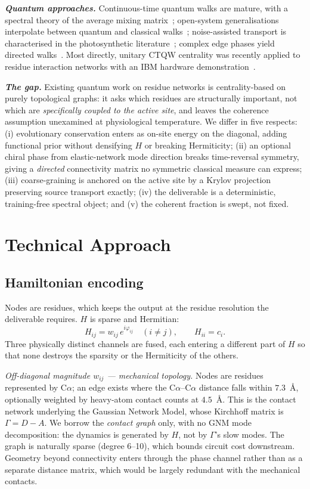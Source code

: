 \documentclass[10pt,a4paper]{article}
\newcommand{\lead}[1]{\textbf{\textit{#1}}}
\begin{document}
\lead{Quantum approaches.} Continuous-time quantum walks are mature, with a spectral theory of the
average mixing matrix~\cite{godsil2013}; open-system generalisations interpolate between quantum and
classical walks~\cite{whitfield2010}; noise-assisted transport is characterised in the photosynthetic
literature~\cite{mohseni2008,rebentrost2009}; complex edge phases yield directed
walks~\cite{lu2016}. Most directly, unitary CTQW centrality was recently applied to
residue interaction networks with an IBM hardware demonstration~\cite{mohtashim2026}.

\lead{The gap.} Existing quantum work on residue networks is centrality-based on purely topological
graphs: it asks which residues are structurally important, not which are \emph{specifically coupled
to the active site}, and leaves the coherence assumption unexamined at physiological temperature. We
differ in five respects: (i) evolutionary conservation enters as on-site energy on the diagonal,
adding functional prior without densifying $H$ or breaking Hermiticity; (ii) an optional chiral phase
from elastic-network mode direction breaks time-reversal symmetry, giving a \emph{directed}
connectivity matrix no symmetric classical measure can express; (iii) coarse-graining is anchored on
the active site by a Krylov projection preserving source transport exactly; (iv) the deliverable is a
deterministic, training-free spectral object; and (v) the coherent fraction is swept, not fixed.

\section{Technical Approach}

\subsection{Hamiltonian encoding}

Nodes are residues, which keeps the output at the residue resolution the deliverable requires. $H$
is sparse and Hermitian:
\begin{equation}
H_{ij} = w_{ij}\,e^{i\varphi_{ij}} \quad (i \neq j), \qquad H_{ii} = c_i .
\end{equation}
Three physically distinct channels are fused, each entering a different part of $H$ so that none
destroys the sparsity or the Hermiticity of the others.

\emph{Off-diagonal magnitude $w_{ij}$ --- mechanical topology.} Nodes are residues represented by
C$\alpha$; an edge exists where the C$\alpha$--C$\alpha$ distance falls within $7.3$~\AA, optionally
weighted by heavy-atom contact counts at $4.5$~\AA. This is the contact network underlying the
Gaussian Network Model, whose Kirchhoff matrix is $\Gamma = D - A$. We borrow the \emph{contact
graph} only, with no GNM mode decomposition: the dynamics is
generated by $H$, not by $\Gamma$'s slow modes. The graph is naturally sparse (degree 6--10), which
bounds circuit cost downstream. Geometry beyond connectivity enters through the phase channel rather
than as a separate distance matrix, which would be largely redundant with the mechanical contacts.
\end{document}
